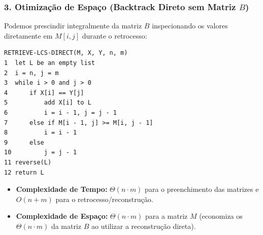 \documentclass[11pt,a4paper]{article}
\begin{document}
\subsubsection*{3. Otimização de Espaço (Backtrack Direto sem Matriz $B$)}
Podemos prescindir integralmente da matriz $B$ inspecionando os valores diretamente em $M[i, j]$ durante o retrocesso:
\begin{lstlisting}
RETRIEVE-LCS-DIRECT(M, X, Y, n, m)
1  let L be an empty list
2  i = n, j = m
3  while i > 0 and j > 0
4      if X[i] == Y[j]
5          add X[i] to L
6          i = i - 1, j = j - 1
7      else if M[i - 1, j] >= M[i, j - 1]
8          i = i - 1
9      else
10         j = j - 1
11 reverse(L)
12 return L
\end{lstlisting}

\begin{itemize}
    \item \textbf{Complexidade de Tempo:} $\Theta(n \cdot m)$ para o preenchimento das matrizes e $O(n + m)$ para o retrocesso/reconstrução.
    \item \textbf{Complexidade de Espaço:} $\Theta(n \cdot m)$ para a matriz $M$ (economiza os $\Theta(n \cdot m)$ da matriz $B$ ao utilizar a reconstrução direta).
\end{itemize}
\end{document}
